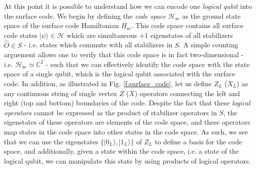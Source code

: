 \documentclass[onecolumn,preprintnumbers,amsmath,amssymb,notitlepage,nofootinbib,longbibliography,superscriptaddress]{revtex4-1}
\begin{document}
    At this point it is possible to understand how we can encode one \textit{logical qubit} into the surface code. We begin by defining the \textit{code space} $\mathcal{H}_{\mathrm{sc}}$ as the ground state space of the surface code Hamiltonian $H_{\mathrm{sc}}$. This code space contains all surface code states $|\psi\rangle \in \mathcal{H}$ which are simultaneous $+1$ eigenstates of all stabilizers $\hat{O} \in S$ - i.e. states which commute with all stabilizers in $S$. A simple counting arguement allows one to verify that this code space is in fact two-dimensional - i.e. $\mathcal{H}_{\mathrm{sc}} \simeq \mathbb{C}^2$ - such that we can effectively identify the code space with the state space of a single qubit, which is the logical qubit associated with the surface code. In addition, as illustrated in Fig. \ref{f:surface_code}, let us define $Z_L$ ($X_L$) as any continuous string of single vertex $Z$ ($X$) operators connecting the left and right (top and bottom) boundaries of the code. Despite the fact that these \textit{logical operators} cannot be expressed as the product of stabilizer operators in $S$, the eigenstates of these operators are elements of the code space, and these operators map states in the code space into other states in the code space. As such, we see that we can use the eigenstates $\{ |0_L\rangle, |1_L\rangle \}$ of $Z_L$ to define a basis for the code space, and additionally, given a state within the code space, i.e. a state of the logical qubit, we can manipulate this state by using products of logical operators. 
\end{document}
